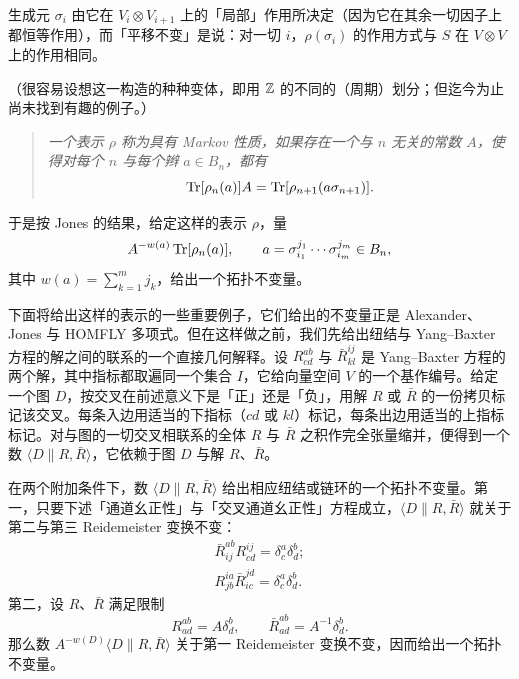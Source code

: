 
生成元 $\sigma_i$ 由它在 $V_i\otimes V_{i+1}$ 上的「局部」作用所决定（因为它在其余一切因子上都恒等作用），而「平移不变」是说：对一切 $i$，$\rho(\sigma_i)$ 的作用方式与 $S$ 在 $V\otimes V$ 上的作用相同。

（很容易设想这一构造的种种变体，即用 $\mathbb{Z}$ 的不同的（周期）划分；但迄今为止尚未找到有趣的例子。）

\begin{quote}
\itshape
一个表示 $\rho$ 称为具有 Markov 性质，如果存在一个与 $n$ 无关的常数 $A$，使得对每个 $n$ 与每个辫 $a\in B_n$，都有
\[
\operatorname{Tr}[\rho_n(a)]A=\operatorname{Tr}[\rho_{n+1}(a\sigma_{n+1})].
\]
\end{quote}


于是按 Jones 的结果，给定这样的表示 $\rho$，量
\[
A^{-w(a)}\operatorname{Tr}[\rho_n(a)],\qquad
a=\sigma_{i_1}^{j_1}\cdots\sigma_{i_m}^{j_m}\in B_n,
\]
其中 $w(a)=\sum_{k=1}^{m}j_k$，给出一个拓扑不变量。

下面将给出这样的表示的一些重要例子，它们给出的不变量正是 Alexander、Jones 与 HOMFLY 多项式。但在这样做之前，我们先给出纽结与 Yang--Baxter 方程的解之间的联系的一个直接几何解释。设 $R_{cd}^{ab}$ 与 $\bar R_{kl}^{ij}$ 是 Yang--Baxter 方程的两个解，其中指标都取遍同一个集合 $I$，它给向量空间 $V$ 的一个基作编号。给定一个图 $D$，按交叉在前述意义下是「正」还是「负」，用解 $R$ 或 $\bar R$ 的一份拷贝标记该交叉。每条入边用适当的下指标（$cd$ 或 $kl$）标记，每条出边用适当的上指标标记。对与图的一切交叉相联系的全体 $R$ 与 $\bar R$ 之积作完全张量缩并，便得到一个数 $\langle D\|R,\bar R\rangle$，它依赖于图 $D$ 与解 $R$、$\bar R$。

在两个附加条件下，数 $\langle D\|R,\bar R\rangle$ 给出相应纽结或链环的一个拓扑不变量。第一，只要下述「通道幺正性」与「交叉通道幺正性」方程成立，$\langle D\|R,\bar R\rangle$ 就关于第二与第三 Reidemeister 变换不变：
\begin{gather*}
\bar R_{ij}^{ab}R_{cd}^{ij}=\delta_c^a\delta_d^b;\\
R_{jb}^{ia}\bar R_{ic}^{jd}=\delta_c^a\delta_d^b.
\end{gather*}
第二，设 $R$、$\bar R$ 满足限制
\[
R_{ad}^{ab}=A\delta_d^b,\qquad \bar R_{ad}^{ab}=A^{-1}\delta_d^b.
\]
那么数 $A^{-w(D)}\langle D\|R,\bar R\rangle$ 关于第一 Reidemeister 变换不变，因而给出一个拓扑不变量。

